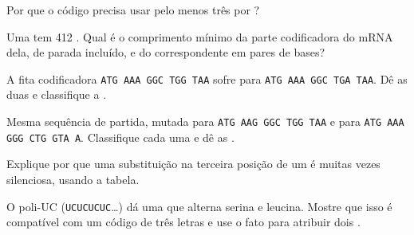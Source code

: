 \begin{exercise}[$\star$]\label{exo:g11:gene-expression:5}
Por que o código precisa usar pelo menos três  por ?
\end{exercise}

\begin{exercise}[$\star\star$]\label{exo:g11:gene-expression:6}
Uma  tem 412 . Qual é o comprimento mínimo da parte
codificadora do mRNA dela,  de parada incluído, e do 
correspondente em pares de bases?
\end{exercise}

\begin{exercise}[$\star\star$]\label{exo:g11:gene-expression:7}
A fita codificadora \texttt{ATG AAA GGC TGG TAA} sofre  para
\texttt{ATG AAA GGC TGA TAA}. Dê as duas  e classifique a
.
\end{exercise}

\begin{exercise}[$\star\star$]\label{exo:g11:gene-expression:8}
Mesma sequência de partida, mutada para \texttt{ATG AAG GGC TGG TAA} e
para \texttt{ATG AAA GGG CTG GTA A}. Classifique cada uma e dê as
.
\end{exercise}

\begin{exercise}[$\star\star$]\label{exo:g11:gene-expression:9}
Explique por que uma substituição na terceira posição de um  é
muitas vezes silenciosa, usando a tabela.
\end{exercise}

\begin{exercise}[$\star\star$]\label{exo:g11:gene-expression:10}
O  poli-UC (\texttt{UCUCUCUC}\dots) dá uma  que alterna
serina e leucina. Mostre que isso é compatível com um código de três
letras e use o fato para atribuir dois .
\end{exercise}

